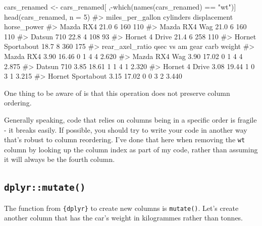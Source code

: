 \documentclass[
  letterpaper,
  DIV=11,
  numbers=noendperiod]{scrreprt}
\newenvironment{Shaded}{\begin{snugshade}}{\end{snugshade}}
\newcommand{\AttributeTok}[1]{\textcolor[rgb]{0.40,0.45,0.13}{#1}}
\newcommand{\CommentTok}[1]{\textcolor[rgb]{0.37,0.37,0.37}{#1}}
\newcommand{\DecValTok}[1]{\textcolor[rgb]{0.68,0.00,0.00}{#1}}
\newcommand{\FunctionTok}[1]{\textcolor[rgb]{0.28,0.35,0.67}{#1}}
\newcommand{\NormalTok}[1]{\textcolor[rgb]{0.00,0.23,0.31}{#1}}
\newcommand{\OtherTok}[1]{\textcolor[rgb]{0.00,0.23,0.31}{#1}}
\newcommand{\SpecialCharTok}[1]{\textcolor[rgb]{0.37,0.37,0.37}{#1}}
\newcommand{\StringTok}[1]{\textcolor[rgb]{0.13,0.47,0.30}{#1}}
\begin{document}
\begin{Shaded}
\begin{Highlighting}[]
\NormalTok{cars\_renamed }\OtherTok{\textless{}{-}}\NormalTok{ cars\_renamed[ ,}\SpecialCharTok{{-}}\FunctionTok{which}\NormalTok{(}\FunctionTok{names}\NormalTok{(cars\_renamed) }\SpecialCharTok{==} \StringTok{"wt"}\NormalTok{)]}
\FunctionTok{head}\NormalTok{(cars\_renamed, }\AttributeTok{n =} \DecValTok{5}\NormalTok{)}
\CommentTok{\#\textgreater{}                   miles\_per\_gallon cylinders displacement horse\_power}
\CommentTok{\#\textgreater{} Mazda RX4                     21.0         6          160         110}
\CommentTok{\#\textgreater{} Mazda RX4 Wag                 21.0         6          160         110}
\CommentTok{\#\textgreater{} Datsun 710                    22.8         4          108          93}
\CommentTok{\#\textgreater{} Hornet 4 Drive                21.4         6          258         110}
\CommentTok{\#\textgreater{} Hornet Sportabout             18.7         8          360         175}
\CommentTok{\#\textgreater{}                   rear\_axel\_ratio  qsec vs am gear carb weight}
\CommentTok{\#\textgreater{} Mazda RX4                    3.90 16.46  0  1    4    4  2.620}
\CommentTok{\#\textgreater{} Mazda RX4 Wag                3.90 17.02  0  1    4    4  2.875}
\CommentTok{\#\textgreater{} Datsun 710                   3.85 18.61  1  1    4    1  2.320}
\CommentTok{\#\textgreater{} Hornet 4 Drive               3.08 19.44  1  0    3    1  3.215}
\CommentTok{\#\textgreater{} Hornet Sportabout            3.15 17.02  0  0    3    2  3.440}
\end{Highlighting}
\end{Shaded}

One thing to be aware of is that this operation does not preserve column
ordering.

Generally speaking, code that relies on columns being in a specific
order is fragile - it breaks easily. If possible, you should try to
write your code in another way that's robust to column reordering. I've
done that here when removing the \texttt{wt} column by looking up the
column index as part of my code, rather than assuming it will always be
the fourth column.

\subsection{\texorpdfstring{\texttt{dplyr::mutate()}}{dplyr::mutate()}}\label{dplyrmutate}

The function from \texttt{\{dplyr\}} to create new columns is
\texttt{mutate()}. Let's create another column that has the car's weight
in kilogrammes rather than tonnes.
\end{document}
